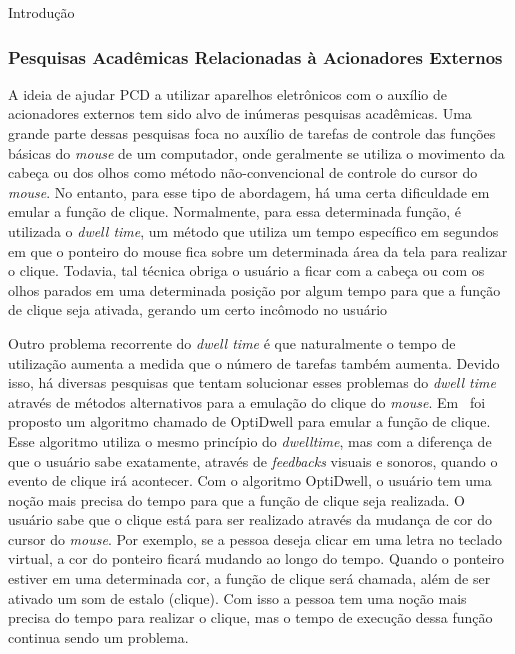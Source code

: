 \begin{chapter}{Introdução}
\subsubsection {Pesquisas Acadêmicas Relacionadas à Acionadores Externos}

A ideia de ajudar PCD a utilizar aparelhos eletrônicos com o auxílio de
acionadores externos tem sido alvo de inúmeras pesquisas acadêmicas. Uma grande
parte dessas pesquisas foca no auxílio de tarefas de controle das funções
básicas do \textit{mouse} de um computador, onde geralmente se utiliza o
movimento da cabeça ou dos olhos como método não-convencional de controle do
cursor do \textit{mouse}. No entanto, para esse tipo de abordagem, há uma certa
dificuldade em emular a função de clique.  Normalmente, para essa determinada
função,  é utilizada o \textit{dwell time}, um método que utiliza um tempo
específico em segundos em que o ponteiro do mouse fica sobre um determinada área
da tela para realizar  o clique. Todavia, tal técnica obriga o usuário a ficar
com a cabeça ou com os olhos parados em uma determinada posição por algum tempo
para que a função de clique seja ativada, gerando um certo incômodo no usuário%

Outro problema recorrente do \textit{dwell time} é que naturalmente o tempo de
utilização aumenta a medida que o número de tarefas também aumenta. Devido isso,
há diversas pesquisas que tentam solucionar esses problemas do \textit{dwell
time} através de métodos alternativos para a emulação do clique do
\textit{mouse}.  Em~\cite{Aanand18} foi proposto um algoritmo chamado de
OptiDwell para emular a função de clique.  Esse algoritmo utiliza o mesmo
princípio do \textit{dwelltime}, mas com a diferença de que o usuário sabe
exatamente, através de \textit{feedbacks} visuais e sonoros, quando o evento de
clique irá acontecer.  Com o algoritmo OptiDwell, o usuário tem uma noção mais
precisa do tempo para que a função de clique seja realizada. O usuário sabe que
o clique está para ser realizado através da mudança de cor do cursor do
\textit{mouse}. Por exemplo, se a pessoa deseja clicar em uma letra no teclado
virtual, a cor do ponteiro ficará mudando ao longo do tempo. Quando o ponteiro
estiver em uma determinada cor, a função de clique será chamada, além de ser
ativado um som de estalo (clique). Com isso a pessoa tem uma noção mais precisa do
tempo para realizar o clique, mas o tempo de execução dessa função continua 
sendo um problema.


\end{chapter}
